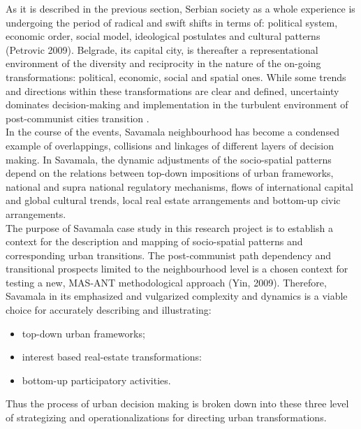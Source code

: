 \documentclass[11pt]{report}
\begin{document}
As it is described in the previous section, Serbian society as a whole experience is undergoing the period of radical and swift shifts in terms of: political system, economic order, social model, ideological postulates and cultural patterns (Petrovic 2009). Belgrade, its capital city, is thereafter a representational environment of the diversity and reciprocity in the nature of the on-going transformations: political, economic, social and spatial ones.
While some trends and directions within these transformations are clear and defined, uncertainty dominates decision-making and implementation in the turbulent environment of post-communist cities transition \cite{(Nedovic-Budic, 2001)}.
\\
In the course of the events, Savamala neighbourhood has become a condensed example of overlappings, collisions and linkages of different layers of decision making. In Savamala, the dynamic adjustments of the socio-spatial patterns depend on the relations between top-down impositions of urban frameworks, national and supra national regulatory mechanisms, flows of international capital and global cultural trends, local real estate arrangements and bottom-up civic arrangements.
\\
The purpose of Savamala case study in this research project is to establish a context for the description and mapping of socio-spatial patterns and corresponding urban transitions. The post-communist path dependency and transitional prospects limited to the neighbourhood level is a chosen context for testing a new, MAS-ANT methodological approach (Yin, 2009). Therefore, Savamala in its emphasized and vulgarized complexity and dynamics is a viable choice for accurately describing and illustrating:
\begin{itemize}
\item top-down urban frameworks;
\item interest based real-estate transformations:
\item bottom-up participatory activities.
\end{itemize}

Thus the process of urban decision making is broken down into these three level of strategizing and operationalizations for directing urban transformations. 
\end{document}
